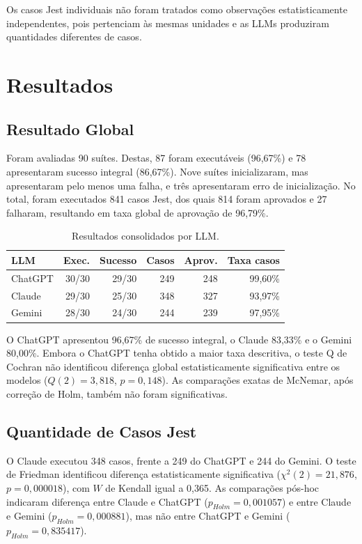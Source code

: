 \documentclass[12pt]{article}
\begin{document}
Os casos Jest individuais não foram tratados como observações estatisticamente independentes, pois pertenciam às mesmas unidades e as LLMs produziram quantidades diferentes de casos.

\section{Resultados}

\subsection{Resultado Global}

Foram avaliadas 90 suítes. Destas, 87 foram executáveis (96,67\%) e 78 apresentaram sucesso integral (86,67\%). Nove suítes inicializaram, mas apresentaram pelo menos uma falha, e três apresentaram erro de inicialização. No total, foram executados 841 casos Jest, dos quais 814 foram aprovados e 27 falharam, resultando em taxa global de aprovação de 96,79\%.

\begin{table}[H]
\centering
\caption{Resultados consolidados por LLM.}
\label{tab:resultados-llm}
\begin{tabular}{lrrrrr}
\toprule
LLM & Exec. & Sucesso & Casos & Aprov. & Taxa casos \\
\midrule
ChatGPT & 30/30 & 29/30 & 249 & 248 & 99,60\% \\
Claude   & 29/30 & 25/30 & 348 & 327 & 93,97\% \\
Gemini   & 28/30 & 24/30 & 244 & 239 & 97,95\% \\
\bottomrule
\end{tabular}
\end{table}

O ChatGPT apresentou 96,67\% de sucesso integral, o Claude 83,33\% e o Gemini 80,00\%. Embora o ChatGPT tenha obtido a maior taxa descritiva, o teste Q de Cochran não identificou diferença global estatisticamente significativa entre os modelos ($Q(2)=3,818$, $p=0,148$). As comparações exatas de McNemar, após correção de Holm, também não foram significativas.

\subsection{Quantidade de Casos Jest}

O Claude executou 348 casos, frente a 249 do ChatGPT e 244 do Gemini. O teste de Friedman identificou diferença estatisticamente significativa ($\chi^2(2)=21,876$, $p=0,000018$), com $W$ de Kendall igual a 0,365. As comparações pós-hoc indicaram diferença entre Claude e ChatGPT ($p_{Holm}=0,001057$) e entre Claude e Gemini ($p_{Holm}=0,000881$), mas não entre ChatGPT e Gemini ($p_{Holm}=0,835417$).
\end{document}
